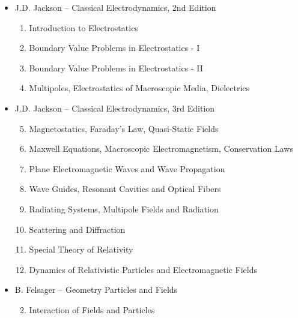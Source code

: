 \begin{itemize}
\item J.D. Jackson -- Classical Electrodynamics, 2nd Edition
\begin{enumerate}
\setcounter{enumi}{0}
\item Introduction to Electrostatics
\item Boundary Value Problems in Electrostatics - I
\item Boundary Value Problems in Electrostatics - II
\item Multipoles, Electrostatics of Macroscopic Media, Dielectrics
\end{enumerate}

\item J.D. Jackson -- Classical Electrodynamics, 3rd Edition
\begin{enumerate}
\setcounter{enumi}{4}
\item Magnetostatics, Faraday's Law, Quasi-Static Fields
\item Maxwell Equations, Macroscopic Electromagnetism, Conservation Laws
\item Plane Electromagnetic Waves and Wave Propagation
\item Wave Guides, Resonant Cavities and Optical Fibers
\item Radiating Systems, Multipole Fields and Radiation
\item Scattering and Diffraction
\item Special Theory of Relativity
\item Dynamics of Relativistic Particles and Electromagnetic Fields
\end{enumerate}

\item B. Felsager -- Geometry Particles and Fields
\begin{enumerate}
\setcounter{enumi}{1}
\item Interaction of Fields and Particles
\end{enumerate}


\end{itemize}
